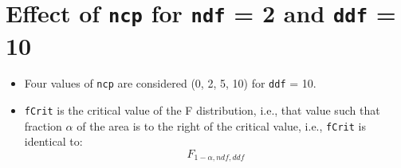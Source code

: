 \documentclass[
]{book}
\providecommand{\tightlist}{%
  \setlength{\itemsep}{0pt}\setlength{\parskip}{0pt}}
\begin{document}
\hypertarget{effect-of-ncp-for-ndf-2-and-ddf-10}{%
\section{\texorpdfstring{Effect of \texttt{ncp} for \texttt{ndf} = 2 and \texttt{ddf} = 10}{Effect of ncp for ndf = 2 and ddf = 10}}\label{effect-of-ncp-for-ndf-2-and-ddf-10}}

\begin{itemize}
\tightlist
\item
  Four values of \texttt{ncp} are considered (0, 2, 5, 10) for \texttt{ddf} = 10.
\item
  \texttt{fCrit} is the critical value of the F distribution, i.e., that value such that fraction \(\alpha\) of the area is to the right of the critical value, i.e., \texttt{fCrit} is identical to:
  \begin{equation*} 
  F_{1-\alpha ,ndf,ddf}
  \end{equation*}
\end{itemize}
\end{document}
